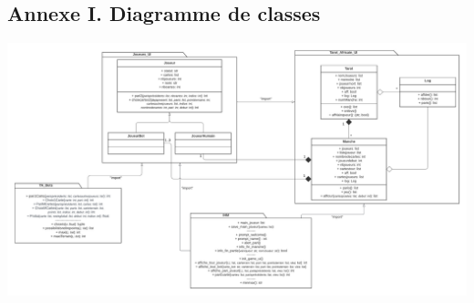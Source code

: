 \begin{landscape}
   \section*{Annexe I. Diagramme de classes}
   \begin{center}
      \includegraphics[height=.87\textwidth]{imgs/ClassDiagram_UI}
   \end{center}

\end{landscape}